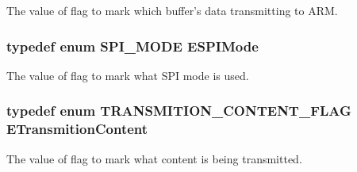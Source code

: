 The value of flag to mark which buffer's data transmitting to A\-R\-M. \hypertarget{group___enum_grp_ga34cca0902b647bf356893ca1ee8d202b}{
\subsubsection[{E\-S\-P\-I\-Mode}]{\setlength{\rightskip}{0pt plus 5cm}typedef enum S\-P\-I\-\_\-\-M\-O\-D\-E  {\bf E\-S\-P\-I\-Mode}}}\label{group___enum_grp_ga34cca0902b647bf356893ca1ee8d202b}
The value of flag to mark what S\-P\-I mode is used. \hypertarget{group___enum_grp_ga1cca30b0867e98d31885e58f552270e0}{
\subsubsection[{E\-Transmition\-Content}]{\setlength{\rightskip}{0pt plus 5cm}typedef enum T\-R\-A\-N\-S\-M\-I\-T\-I\-O\-N\-\_\-\-C\-O\-N\-T\-E\-N\-T\-\_\-\-F\-L\-A\-G  {\bf E\-Transmition\-Content}}}\label{group___enum_grp_ga1cca30b0867e98d31885e58f552270e0}
The value of flag to mark what content is being transmitted. 